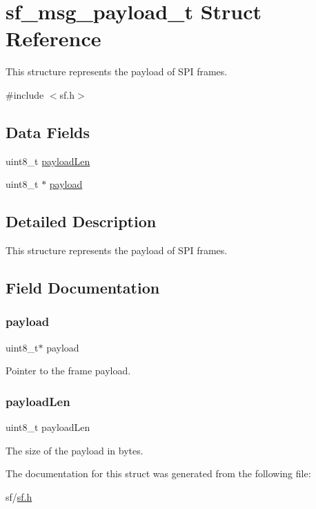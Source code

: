\hypertarget{structsf__msg__payload__t}{}\section{sf\+\_\+msg\+\_\+payload\+\_\+t Struct Reference}
\label{structsf__msg__payload__t}


This structure represents the payload of S\+PI frames.  




{\ttfamily \#include $<$sf.\+h$>$}

\subsection*{Data Fields}
\begin{DoxyCompactItemize}
\item 
uint8\+\_\+t \mbox{\hyperlink{structsf__msg__payload__t_ae4d38aba40b6dddf544612da0726cd7e}{payload\+Len}}
\item 
uint8\+\_\+t $\ast$ \mbox{\hyperlink{structsf__msg__payload__t_aa5cbdad2c57e9b3f949e1a4d96382b66}{payload}}
\end{DoxyCompactItemize}


\subsection{Detailed Description}
This structure represents the payload of S\+PI frames. 

\subsection{Field Documentation}
\mbox{\label{structsf__msg__payload__t_aa5cbdad2c57e9b3f949e1a4d96382b66}} 
\subsubsection{\texorpdfstring{payload}{payload}}
{\footnotesize\ttfamily uint8\+\_\+t$\ast$ payload}

Pointer to the frame payload. \mbox{\label{structsf__msg__payload__t_ae4d38aba40b6dddf544612da0726cd7e}} 
\subsubsection{\texorpdfstring{payloadLen}{payloadLen}}
{\footnotesize\ttfamily uint8\+\_\+t payload\+Len}

The size of the payload in bytes. 

The documentation for this struct was generated from the following file\+:\begin{DoxyCompactItemize}
\item 
sf/\mbox{\hyperlink{sf_8h}{sf.\+h}}\end{DoxyCompactItemize}
